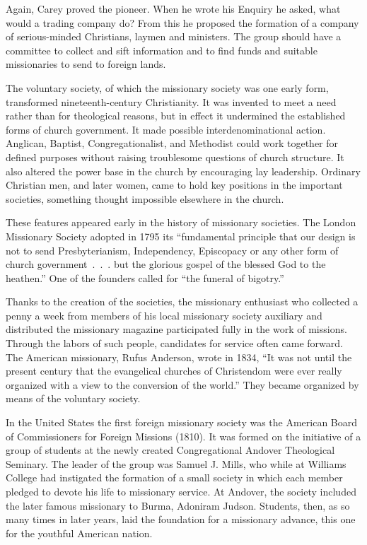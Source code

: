 Again, Carey proved the pioneer. When he wrote his Enquiry he asked, what would a trading company
do? From this he proposed the formation of a company of serious-minded Christians, laymen and
ministers. The group should have a committee to collect and sift information and to find funds and
suitable missionaries to send to foreign lands.

The voluntary society, of which the missionary society was one early form, transformed
nineteenth-century Christianity. It was invented to meet a need rather than for theological reasons,
but in effect it undermined the established forms of church government. It made possible
interdenominational action. Anglican, Baptist, Congregationalist, and Methodist could work together
for defined purposes without raising troublesome questions of church structure. It also altered the
power base in the church by encouraging lay leadership. Ordinary Christian men, and later women,
came to hold key positions in the important societies, something thought impossible elsewhere in the
church.

These features appeared early in the history of missionary societies. The London Missionary Society
adopted in 1795 its “fundamental principle that our design is not to send Presbyterianism,
Independency, Episcopacy or any other form of church government~.~.~. but the glorious gospel of the
blessed God to the heathen.” One of the founders called for “the funeral of bigotry.”

Thanks to the creation of the societies, the missionary enthusiast who collected a penny a week from
members of his local missionary society auxiliary and distributed the missionary magazine
participated fully in the work of missions. Through the labors of such people, candidates for
service often came forward. The American missionary, Rufus Anderson, wrote in 1834, “It was not
until the present century that the evangelical churches of Christendom were ever really organized
with a view to the conversion of the world.” They became organized by means of the voluntary
society.

In the United States the first foreign missionary society was the American Board of Commissioners
for Foreign Missions (1810). It was formed on the initiative of a group of students at the newly
created Congregational Andover Theological Seminary. The leader of the group was Samuel J. Mills,
who while at Williams College had instigated the formation of a small society in which each member
pledged to devote his life to missionary service. At Andover, the society included the later famous
missionary to Burma, Adoniram Judson. Students, then, as so many times in later years, laid the
foundation for a missionary advance, this one for the youthful American nation.

